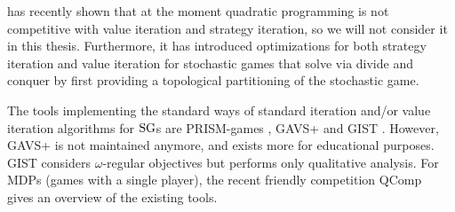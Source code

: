 \cite{gandalf} has recently shown that at the moment quadratic programming is not competitive with value iteration and strategy iteration,
so we will not consider it in this thesis. 
Furthermore, it has introduced optimizations for both strategy iteration and value iteration for stochastic games that solve via divide and conquer by 
first providing a topological partitioning of the stochastic game.


The tools implementing the standard ways of standard iteration and/or value iteration algorithms for $\textrm{SG}$s are PRISM-games \cite{PRISM-games}, 
GAVS+ \cite{gavs+} and GIST \cite{chatterjee2010gist}.
However, GAVS+ is not maintained anymore, and exists more for educational purposes.
GIST considers $\omega$-regular objectives but performs only qualitative analysis. 
For MDPs (games with a single player), the recent friendly competition QComp~\cite{qcomp} gives an overview of the existing tools.